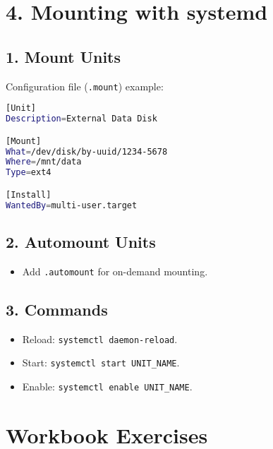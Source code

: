 \documentclass[a4paper]{report}
\begin{document}
\section*{4. Mounting with systemd}

\subsection*{1. Mount Units}
Configuration file (\texttt{.mount}) example:
\begin{lstlisting}[language=bash]
[Unit]
Description=External Data Disk

[Mount]
What=/dev/disk/by-uuid/1234-5678
Where=/mnt/data
Type=ext4

[Install]
WantedBy=multi-user.target
\end{lstlisting}

\subsection*{2. Automount Units}
\begin{itemize}
    \item Add \texttt{.automount} for on-demand mounting.
\end{itemize}

\subsection*{3. Commands}
\begin{itemize}
    \item Reload: \texttt{systemctl daemon-reload}.
    \item Start: \texttt{systemctl start UNIT\_NAME}.
    \item Enable: \texttt{systemctl enable UNIT\_NAME}.
\end{itemize}

\section*{Workbook Exercises}
\end{document}
